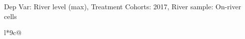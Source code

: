 \begin{table}[H]
\captionlistentry[table]{}
\label{table:beaver_hydrometry_DVlevel_max_SCg2}
\tiny %
Dep Var: River level (max), Treatment Cohorts: 2017, River sample: On-river cells \\
\begin{threeparttable}
\begin{tabulary}{\textwidth}{l*{9}{c}@{}}
\toprule \toprule
\noalign{\smallskip}
\noalign{\smallskip}
\midrule \bottomrule
\end{tabulary}
\medskip
\end{threeparttable}
\end{table}
